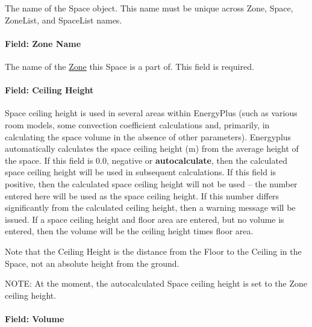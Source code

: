 The name of the Space object. This name must be unique across Zone, Space, ZoneList, and SpaceList names.

\paragraph{Field: Zone Name}\label{space-zone-name}

The name of the \hyperref[zone]{Zone} this Space is a part of. This field is required.

\paragraph{Field: Ceiling Height}\label{field-space-ceiling-height}

Space ceiling height is used in several areas within EnergyPlus (such as various room models, some convection coefficient calculations and, primarily, in calculating the space volume in the absence of other parameters). Energyplus automatically calculates the space ceiling height (m) from the average height of the space. If this field is 0.0, negative or \textbf{autocalculate}, then the calculated space ceiling height will be used in subsequent calculations. If this field is positive, then the calculated space ceiling height will not be used -- the number entered here will be used as the space ceiling height. If this number differs significantly from the calculated ceiling height, then a warning message will be issued. If a space ceiling height and floor area are entered, but no volume is entered, then the volume will be the ceiling height times floor area.

Note that the Ceiling Height is the distance from the Floor to the Ceiling in the Space, not an absolute height from the ground.

NOTE: At the moment, the autocalculated Space ceiling height is set to the Zone ceiling height.

\paragraph{Field: Volume}\label{field-space-volume}

